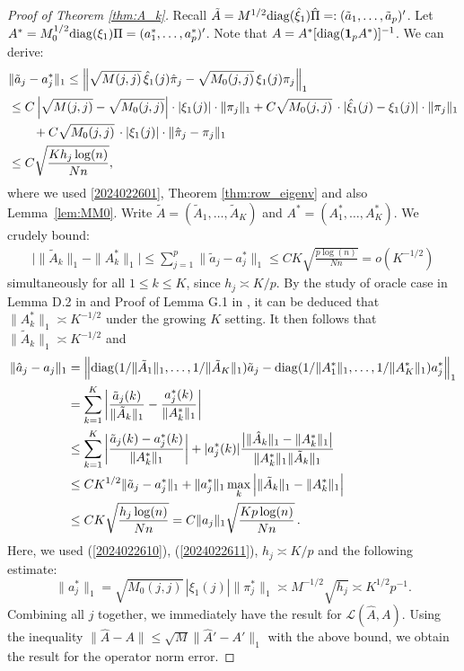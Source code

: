 \documentclass[preprint,11pt]{article}
\numberwithin{equation}{section}
\begin{document}
\begin{proof}[Proof of Theorem \ref{thm:A_k}]
Recall $\tilde A = M^{1/2} {\rm diag}(\hat \xi_1)\hat \Pi =:(\tilde a_1, \ldots, \tilde a_p)'$. Let $A^* = M_0^{1/2}{\rm diag} (\xi_1) \Pi = (a^*_1, \ldots, a^*_p)'$. Note that  $A = A^* [{\rm diag}({\bf 1}_p A^*)]^{-1}$. We can derive:
\begin{align}\label{2024022610}
&\|\tilde a_j - a^*_j \|_1  \leq  \Big\|  \sqrt{M(j,j)}  \, \hat \xi_1(j)\hat \pi_j  -  \sqrt{M_0(j,j)}  \, \xi_1(j) \pi_j \Big\|_1 \notag\\
& \leq C \left|\sqrt{M(j,j)}  - \sqrt{M_0(j,j)} \right| \cdot | \xi_1(j)| \cdot \|\pi_j\|_1 + C\sqrt{M_0(j,j)}\, \cdot  | \hat \xi_1(j) - \xi_1(j)|\cdot \|\pi_j\|_1  \notag\\
&\qquad + C\sqrt{M_0(j,j)}\, \cdot  | \xi_1(j)|\cdot \|\hat \pi_j - \pi_j\|_1  \notag\\
& \leq C \sqrt{\frac{Kh_j \log (n) }{Nn}},
\end{align}
where we used \eqref{2024022601}, Theorem \ref{thm:row_eigenv} and also Lemma~\ref{lem:MM0}.  Write $\tilde A = (\tilde A_1, \ldots, \tilde A_K)$ and $A^* = (A_1^*, \ldots, A_K^*)$.   We crudely bound: 
\begin{align}\label{2024022611}
\Big| \|\tilde A_k\|_1  - \|A^*_k\|_1\Big|\leq  \sum_{j=1}^p \|\tilde a_j - a^*_j \|_1 \leq
C K\sqrt{\frac{p \log (n) }{Nn}} =o(K^{-1/2}) 
\end{align}
simultaneously for all $1\leq k \leq K$,
since $h_j\asymp K/p$. By the study of oracle case in Lemma D.2 in \cite{ke2024using} and Proof of Lemma G.1 in \cite{ke2024using}, it can be deduced that $\|A^*_k\|_1\asymp K^{-1/2}$ under the growing $K$ setting. It then follows that $\|\tilde A_k\|_1\asymp K^{-1/2}$ and
\begin{align*}
\|\hat a_j - a_j \|_1 &=\Big\|{\rm diag} (1/\|\tilde A_1\|_1, \ldots, 1/\|\tilde A_K\|_1 )  \tilde a_j  - {\rm diag} (1/\| A^*_1\|_1, \ldots, 1/\|A^*_K\|_1 )  a^*_j \Big\|_1 \notag\\
& = \sum_{k=1}^K \bigg|  \frac{\tilde a_j(k) }{\|\tilde A_k\|_1} -  \frac{a^*_j(k)}{\|A^*_k\|_1} \bigg|\notag\\
& \leq  \sum_{k=1}^K \bigg|  \frac{\tilde a_j(k) - a^*_j(k) }{\|A^*_k\|_1} \bigg| + |a^*_j(k)| \frac{\big|\|\hat A_k\|_1 - \|A^*_k\|_1 \big|}{\|A^*_k\|_1\|\tilde A_k\|_1} \notag\\
& \leq C K^{1/2} \|\tilde a_j - a^*_j \|_1   + \|a_j^*\|_1 \max_{k}\Big| \|\tilde A_k\|_1  - \|A^*_k\|_1\Big| \notag\\
&  \leq
CK  \sqrt{\frac{h_j \log (n) }{Nn}}  = C\|a_j\|_1 \sqrt{\frac{Kp \log (n) }{Nn}} \,. 
\end{align*}
Here, we used (\ref{2024022610}), (\ref{2024022611}), $h_j\asymp K/p$ and the following  estimate:
\[
\|a_j^*\|_1 = \sqrt{M_0(j,j)}\,   |\xi_1(j)| \|\pi^*_j\|_1\asymp M^{-1/2}\sqrt{h_j}\asymp K^{1/2}p^{-1}.
\]
Combining all $j$ together, we immediately have the result for $\mathcal L (\hat A, A)$. Using the inequality $\|\widehat{A}-A\|\le \sqrt{M}\|\widehat{A}'-A'\|_1$ with the above bound, we obtain the result for the operator norm error.
\end{proof}
\end{document}
